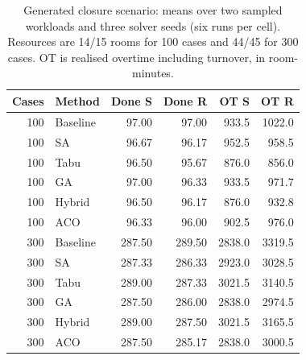 \begin{table}[H]
\centering\small
\caption{Generated closure scenario: means over two sampled workloads and three solver seeds (six runs per cell). Resources are 14/15 rooms for 100 cases and 44/45 for 300 cases. OT is realised overtime including turnover, in room-minutes.}
\label{tab:room-generated}
\begin{tabular}{@{}rlrrrr@{}}
\toprule
Cases & Method & Done S & Done R & OT S & OT R \\
\midrule
100 & Baseline & 97.00 & 97.00 & 933.5 & 1022.0 \\
100 & SA & 96.67 & 96.17 & 952.5 & 958.5 \\
100 & Tabu & 96.50 & 95.67 & 876.0 & 856.0 \\
100 & GA & 97.00 & 96.33 & 933.5 & 971.7 \\
100 & Hybrid & 96.50 & 96.17 & 876.0 & 932.8 \\
100 & ACO & 96.33 & 96.00 & 902.5 & 976.0 \\
300 & Baseline & 287.50 & 289.50 & 2838.0 & 3319.5 \\
300 & SA & 287.33 & 286.33 & 2923.0 & 3028.5 \\
300 & Tabu & 289.00 & 287.33 & 3021.5 & 3140.5 \\
300 & GA & 287.50 & 286.00 & 2838.0 & 2974.5 \\
300 & Hybrid & 289.00 & 287.50 & 3021.5 & 3165.5 \\
300 & ACO & 287.50 & 285.17 & 2838.0 & 3000.5 \\
\bottomrule
\end{tabular}
\end{table}
